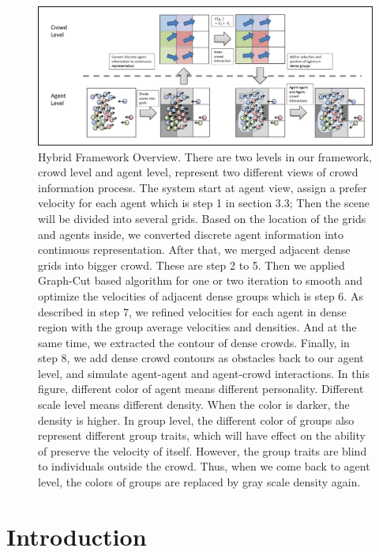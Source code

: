 \documentclass[conference]{acmsiggraph}
\begin{document}
\begin{figure}
  \centering
  \includegraphics[width=6.4in]{images/pipeline}
  \caption{Hybrid Framework Overview. There are two levels in our framework, crowd level and agent level, represent two different views of crowd information process. The system start at agent view, assign a prefer velocity for each agent which is step 1 in section 3.3; Then the scene will be divided into several grids. Based on the location of the grids and agents inside, we converted discrete agent information into continuous representation. After that, we merged adjacent dense grids into bigger crowd. These are step 2 to 5. Then we applied Graph-Cut based algorithm for one or two iteration to smooth and optimize the velocities of adjacent dense groups which is step 6. As described in step 7, we refined velocities for each agent in dense region with the group average velocities and densities. And at the same time, we extracted the contour of dense crowds. Finally, in step 8, we add dense crowd contours as obstacles back to our agent level, and simulate agent-agent and agent-crowd interactions. In this figure, different color of agent means different personality. Different scale level means different density. When the color is darker, the density is higher. In group level, the different color of groups also represent different group traits, which will have effect on the ability of preserve the velocity of itself. However, the group traits are blind to individuals outside the crowd. Thus, when we come back to agent level, the colors of groups are replaced by gray scale density again.}
  \label{figure:pipeline}
\end{figure}

\section{Introduction}
\end{document}
